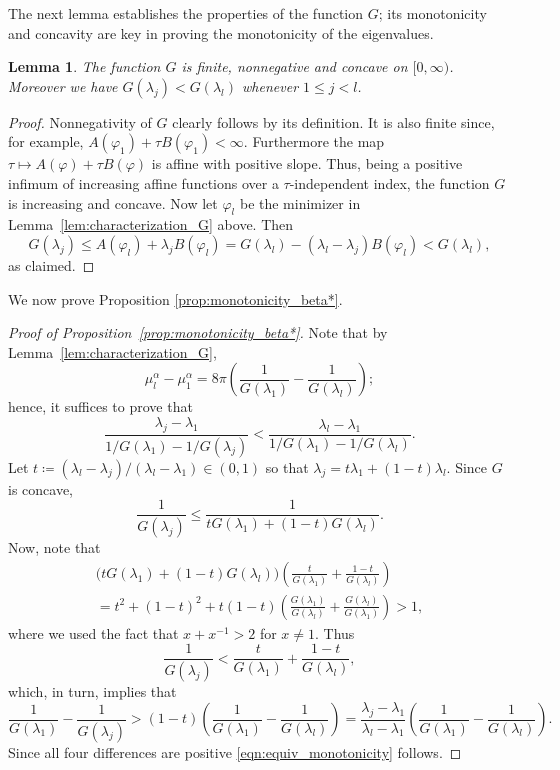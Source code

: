\documentclass[a4paper,11pt,reqno]{amsart}
\numberwithin{equation}{section}
\newtheorem{lemma}[theorem]{Lemma}
\theoremstyle{remark}
\theoremstyle{definition}
\newcommand{\defeq}{\coloneqq}
\renewcommand{\leq}{\leqslant}
\begin{document}
The next lemma establishes the properties of the function $G$; its monotonicity and concavity are key in proving the monotonicity of the eigenvalues.
	\begin{lemma}\label{lem:properties_G}
		The function $G$ is finite, nonnegative and concave on $[0,\infty)$. Moreover we have $G(\lambda_j)<G(\lambda_l)$ whenever $1\leq j < l$.
	\end{lemma}
	
\begin{proof}
Nonnegativity of $G$ clearly follows by its definition. It is also finite since, for example, $A(\varphi_1)+\tau B(\varphi_1) <\infty$. Furthermore the map $\tau \mapsto A(\varphi) +\tau B(\varphi)$ is affine with positive slope. Thus, being a positive infimum of increasing affine functions over a $\tau$-independent index, the function $G$ is increasing and concave. Now let $\varphi_l$ be the minimizer in Lemma~\ref{lem:characterization_G} above. Then
	\[
		G(\lambda_j) \leq A(\varphi_l)+\lambda_j B(\varphi_l) = G(\lambda_l)-(\lambda_l-\lambda_j)B(\varphi_l) < G(\lambda_l),
	\]
as claimed.
\end{proof}

We now prove Proposition \ref{prop:monotonicity_beta*}.

\begin{proof}[Proof of Proposition~\ref{prop:monotonicity_beta*}]
Note that by Lemma~\ref{lem:characterization_G},
	\[
		\mu_l^{\alpha} - \mu_1^{\alpha} = 8\pi \left(\frac{1}{G(\lambda_1)}-\frac{1}{G(\lambda_l)}\right);
	\]
hence, it suffices to prove that
	\begin{equation}\label{eqn:equiv_monotonicity}
		\frac{\lambda_j-\lambda_1}{1/G(\lambda_1)-1/G(\lambda_j)} < \frac{\lambda_l-\lambda_1}{1/G(\lambda_1)-1/G(\lambda_l)}.
	\end{equation}
Let $t\defeq (\lambda_l-\lambda_j)/(\lambda_l-\lambda_1)\in (0,1)$ so that $\lambda_j = t\lambda_1 + (1-t)\lambda_l$. Since $G$ is concave,
	\[
		\frac{1}{G(\lambda_j)} \leq \frac{1}{tG(\lambda_1)+(1-t)G(\lambda_l)}.
	\]
Now, note that
	\begin{multline*}
		\big(tG(\lambda_1)+(1-t)G(\lambda_l)\big)\left(\frac{t}{G(\lambda_1)}+\frac{1-t}{G(\lambda_l)}\right)\\ 
					=t^2 + (1-t)^2 + t(1-t)\left(\frac{G(\lambda_1)}{G(\lambda_l)}+\frac{G(\lambda_l)}{G(\lambda_1)}\right) > 1,
	\end{multline*}
where we used the fact that $x+x^{-1}>2$ for $x\neq 1$. Thus
	\[
		\frac{1}{G(\lambda_j)} < \frac{t}{G(\lambda_1)}+\frac{1-t}{G(\lambda_l)},
	\]
which, in turn, implies that
	\[
		\frac{1}{G(\lambda_1)}-\frac{1}{G(\lambda_j)} > (1-t)\left(\frac{1}{G(\lambda_1)}-\frac{1}{G(\lambda_l)}\right) = \frac{\lambda_j-\lambda_1}{\lambda_l-\lambda_1}\left(\frac{1}{G(\lambda_1)}-\frac{1}{G(\lambda_l)}\right).
	\]
Since all four differences are positive \eqref{eqn:equiv_monotonicity} follows.
\end{proof}
\end{document}
